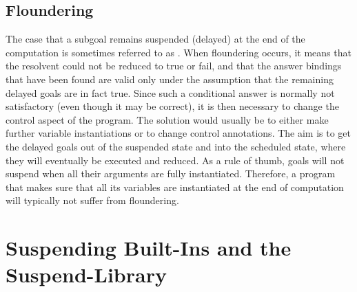 \subsection{Floundering}
The case that a subgoal remains suspended (delayed) at the end of the
computation
 is sometimes referred to as .
When floundering occurs, it means that the resolvent could not be reduced
to true or fail, and that the answer bindings that have been found
are valid only under the assumption that the remaining delayed goals
are in fact true. Since such a conditional answer is normally not
satisfactory (even though it may be correct), it is then necessary to change
the control aspect of the program.  The solution would usually be to either
make further variable instantiations or to change control annotations.
The aim is to get the delayed goals out of the suspended state and
into the scheduled state, where they will eventually be executed and reduced.
As a rule of thumb, goals will not suspend when all their arguments are
fully instantiated. Therefore, a program that makes sure that all its
variables are instantiated at the end of computation will typically not
suffer from floundering.


\section{Suspending Built-Ins and the Suspend-Library}

